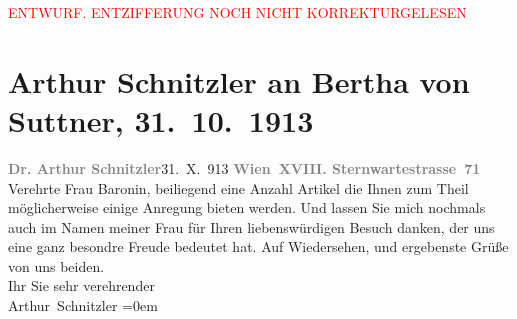 
\begin{center}
            \textcolor{red}{ENTWURF. ENTZIFFERUNG NOCH NICHT KORREKTURGELESEN}
                      \end{center}
            
               \section[Arthur Schnitzler an Bertha von Suttner, 31. 10. 1913]{ Arthur Schnitzler an Bertha von Suttner,
                    31. 10. 1913}\nopagebreak{}\rehead{ }\begin{ledgroupsized}[t]{13cm}\normalsize\beginnumbering{} \toendnotes[C]{\smallbreak\pagebreak[2]} 
\toendnotes[C]{\smallbreak}\pstart
           \noindent{}{\pb}\textcolor{gray}{\textbf{Dr. Arthur Schnitzler}}\hfill 31. X. 913\pend
           \pstart
           \textcolor{gray}{\textbf{Wien XVIII. Sternwartestrasse 71}}\pend
           \pstart{}Verehrte Frau Baronin,\pend\pstart
           beiliegend eine Anzahl Artikel die Ihnen zum Theil möglicherweise einige Anregung
                    bieten werden. Und lassen Sie mich nochmals auch im Namen meiner Frau für Ihren
                    liebenswürdigen Besuch {\pb}danken, der uns eine ganz besondre
                    Freude bedeutet hat.\pend
           \pstart
           Auf Wiedersehen, und ergebenste Grüße von uns beiden.{\\[\baselineskip]}Ihr Sie sehr verehrender{\\[\baselineskip]}\spacefill\mbox{Arthur Schnitzler}\pend
           \leftskip=0em{}\endnumbering{}\end{ledgroupsized}  \newcommand{\dateiname}{L02155}\newcommand{\titel}{Arthur Schnitzler an Bertha von Suttner, 31. 10. 1913}\newcommand{\editorInnen}{Martin Anton Müller und Gerd-Hermann Susen}
      